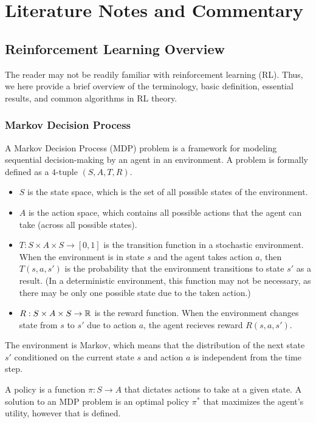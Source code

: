 \chapter{Literature Notes and Commentary}

\section{Reinforcement Learning Overview}

The reader may not be readily familiar with reinforcement learning (RL).
Thus, we here provide a brief overview of the terminology, basic definition, essential results, and common algorithms in RL theory.

\subsection{Markov Decision Process}

A Markov Decision Process (MDP) problem is a framework for modeling sequential decision-making by an agent in an environment.
A problem is formally defined as a $4$-tuple $(S, A, T, R)$.
\begin{itemize}
  \item $S$ is the state space, which is the set of all possible states of the environment.
  \item $A$ is the action space, which contains all possible actions that the agent can take (across all possible states).
  \item $T: S \times A \times S \to [0, 1]$ is the transition function in a stochastic environment. When the environment is in state $s$ and
    the agent takes action $a$, then $T(s, a, s')$ is the probability that the environment transitions to state $s'$ as a result. (In a deterministic environment,
    this function may not be necessary, as there may be only one possible state due to the taken action.)
  \item $R: S \times A \times S \to \mathbb{R}$ is the reward function. When the environment changes state from $s$ to $s'$ due to action $a$, the agent recieves reward $R(s, a, s')$.
\end{itemize}
The environment is Markov, which means that the distribution of the next state $s'$ conditioned on the current state $s$ and action $a$ is independent from the time step.

A policy is a function $\pi: S \to A$ that dictates actions to take at a given state.
A solution to an MDP problem is an optimal policy $\pi^*$ that maximizes the agent's utility, however that is defined.

